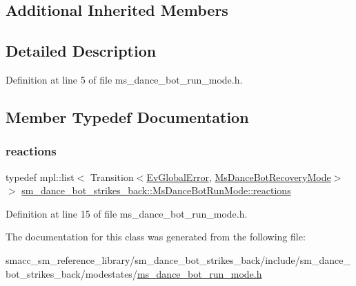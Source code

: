 \subsection*{Additional Inherited Members}


\subsection{Detailed Description}


Definition at line 5 of file ms\+\_\+dance\+\_\+bot\+\_\+run\+\_\+mode.\+h.



\subsection{Member Typedef Documentation}
\mbox{\label{classsm__dance__bot__strikes__back_1_1MsDanceBotRunMode_a49adec1999b0fa5c7b67d8b503cae711}} 
\subsubsection{\texorpdfstring{reactions}{reactions}}
{\footnotesize\ttfamily typedef mpl\+::list$<$ Transition$<$\hyperlink{structsm__dance__bot__strikes__back_1_1EvGlobalError}{Ev\+Global\+Error}, \hyperlink{classsm__dance__bot__strikes__back_1_1MsDanceBotRecoveryMode}{Ms\+Dance\+Bot\+Recovery\+Mode}$>$ $>$ \hyperlink{classsm__dance__bot__strikes__back_1_1MsDanceBotRunMode_a49adec1999b0fa5c7b67d8b503cae711}{sm\+\_\+dance\+\_\+bot\+\_\+strikes\+\_\+back\+::\+Ms\+Dance\+Bot\+Run\+Mode\+::reactions}}



Definition at line 15 of file ms\+\_\+dance\+\_\+bot\+\_\+run\+\_\+mode.\+h.



The documentation for this class was generated from the following file\+:\begin{DoxyCompactItemize}
\item 
smacc\+\_\+sm\+\_\+reference\+\_\+library/sm\+\_\+dance\+\_\+bot\+\_\+strikes\+\_\+back/include/sm\+\_\+dance\+\_\+bot\+\_\+strikes\+\_\+back/modestates/\hyperlink{strikes__back_2include_2sm__dance__bot__strikes__back_2modestates_2ms__dance__bot__run__mode_8h}{ms\+\_\+dance\+\_\+bot\+\_\+run\+\_\+mode.\+h}\end{DoxyCompactItemize}
